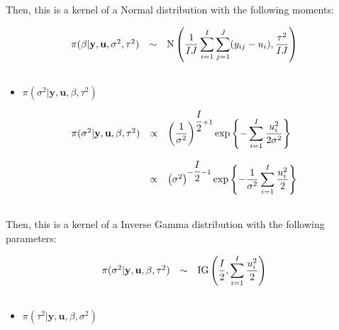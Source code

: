 \documentclass{article}
\begin{document}
Then, this is a kernel of a Normal distribution with the following moments:

\begin{equation*}
\begin{array}{lcl ll }

\pi(\beta|\textbf{y}, \textbf{u}, \sigma^2,\tau^2) & \sim &  \mbox{N}\left( \dfrac{1}{IJ} \displaystyle\sum_{i=1}^{I}\sum_{j=1}^{J} (y_{ij} - u_i) , \dfrac{\tau^2}{IJ} \right)  \\\\

 \end{array}
\end{equation*}


\begin{itemize}
\item $\pi(\sigma^2|\textbf{y}, \textbf{u},\beta,\tau^2)$
\end{itemize}

\begin{equation*}
\begin{array}{lcl ll }
\pi(\sigma^2|\textbf{y}, \textbf{u},\beta,\tau^2) & \propto & \left(\dfrac{1}{\sigma^2}\right)^{\dfrac{I}{2} + 1} \mbox{exp}\left\{ - \displaystyle\sum_{i=1}^{I} \dfrac{u_i^2}{2\sigma^2} \right\} \\\\

 & \propto & \left(\sigma^2\right)^{-\dfrac{I}{2} - 1} \mbox{exp}\left\{ - \dfrac{1}{\sigma^2} \displaystyle\sum_{i=1}^{I} \dfrac{u_i^2}{2}\right\} \\\\

 \end{array}
\end{equation*}

Then, this is a kernel of a Inverse Gamma distribution with the following parameters:

\begin{equation*}
\begin{array}{lcl ll }

\pi(\sigma^2|\textbf{y}, \textbf{u},\beta,\tau^2) & \sim &  \mbox{IG} \left( \dfrac{I}{2} , \displaystyle\sum_{i=1}^{I}\dfrac{u_i^2}{2} \right)  \\\\

 \end{array}
\end{equation*}


\begin{itemize}
\item $\pi(\tau^2|\textbf{y}, \textbf{u},\beta,\sigma^2)$
\end{itemize}
\end{document}
